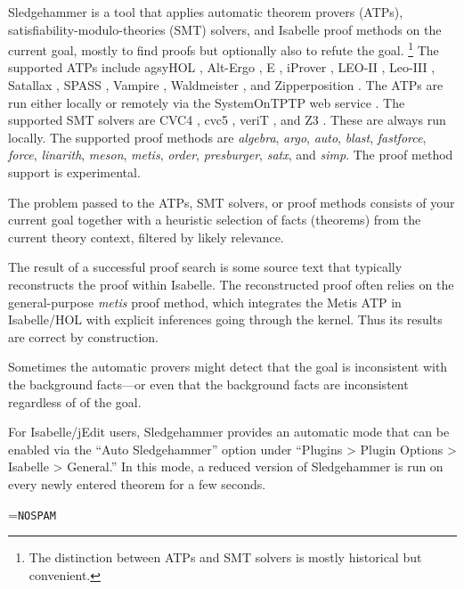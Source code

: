 \documentclass[a4paper,12pt]{article}
\renewcommand\_{\hbox{\textunderscore\kern-.05ex}}
\begin{document}
Sledgehammer is a tool that applies automatic theorem provers (ATPs),
satisfiability-modulo-theories (SMT) solvers, and Isabelle proof methods on the
current goal, mostly to find proofs but optionally also to refute the goal.%
\footnote{The distinction between ATPs and SMT solvers is mostly
historical but convenient.}
%
The supported ATPs include agsyHOL \cite{agsyHOL}, Alt-Ergo \cite{alt-ergo}, E
\cite{schulz-2019}, iProver \cite{korovin-2009}, LEO-II \cite{leo2}, Leo-III
\cite{leo3}, Satallax \cite{satallax}, SPASS \cite{weidenbach-et-al-2009},
Vampire \cite{riazanov-voronkov-2002}, Waldmeister \cite{waldmeister}, and
Zipperposition \cite{cruanes-2014}. The ATPs are run either locally or remotely
via the System\-On\-TPTP web service \cite{sutcliffe-2000}. The supported SMT
solvers are CVC4 \cite{cvc4}, cvc5 \cite{barbosa-et-al-cvc5}, veriT
\cite{bouton-et-al-2009}, and Z3 \cite{de-moura-2008}. These are always run
locally. The supported proof methods are \textit{algebra}, \textit{argo},
\textit{auto}, \textit{blast}, \textit{fastforce}, \textit{force},
\textit{linarith}, \textit{meson}, \textit{metis}, \textit{order},
\textit{presburger}, \textit{satx}, and \textit{simp}. The proof method support
is experimental.

The problem passed to the ATPs, SMT solvers, or proof methods consists
of your current goal together with a heuristic selection of facts (theorems)
from the current theory context, filtered by likely relevance.

The result of a successful proof search is some source text that typically
reconstructs the proof within Isabelle. The reconstructed proof often relies on
the general-purpose \textit{metis} proof method, which integrates the Metis ATP
in Isabelle/HOL with explicit inferences going through the kernel. Thus its
results are correct by construction.

Sometimes the automatic provers might detect that the goal is inconsistent with
the background facts---or even that the background facts are inconsistent
regardless of of the goal.

For Isabelle/jEdit users, Sledgehammer provides an automatic mode that can be
enabled via the ``Auto Sledgehammer'' option under ``Plugins > Plugin Options >
Isabelle > General.'' In this mode, a reduced version of Sledgehammer is run on
every newly entered theorem for a few seconds.

\newbox\boxA
\setbox\boxA=\hbox{\texttt{NOSPAM}}

\newcommand\authoremail{\texttt{jasmin.blan{\color{white}NOSPAM}\kern-\wd\boxA{}chette@\allowbreak
gmail.\allowbreak com}}
\end{document}

